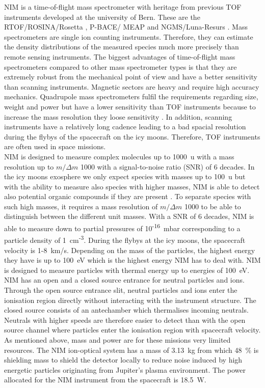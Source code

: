 	NIM is a time-of-flight mass spectrometer with heritage from previous TOF instruments developed at the university of Bern. These are the RTOF/ROSINA/Rosetta \cite{Balsiger2007a,Scherer2006}, P-BACE/ MEAP \cite{Abplanalp2009a} and NGMS/Luna-Resurs \cite{Wurz2012264,Fausch_IEEE}. Mass spectrometers are single ion counting instruments. Therefore, they can estimate the density distributions of the measured species much more precisely than remote sensing instruments. The biggest advantages of time-of-flight mass spectrometers compared to other mass spectrometer types is that they are extremely robust from the mechanical point of view and have a better sensitivity than scanning instruments. Magnetic sectors are heavy and require high accuracy mechanics. Quadrupole mass spectrometers fulfil the requirements regarding size, weight and power but have a lower sensitivity than TOF instruments because to increase the mass resolution they loose sensitivity \cite{Quadrupol_WorkPrinc}. In addition, scanning instruments have a relatively long cadence \cite{MassSpec_Overview} leading to a bad spacial resolution during the flybys of the spacecraft on the icy moons. Therefore, TOF instruments are often used in space missions.\\
	NIM is designed to measure complex molecules up to 1000~u with a mass resolution up to $m/\Delta m$ 1000 with a signal-to-noise ratio (SNR) of 6 decades. In the icy moons exosphere we only expect species with masses up to 100~u but with the ability to measure also species with higher masses, NIM is able to detect also potential organic compounds if they are present \cite{NIM_Req_dMSNR}. To separate species with such high masses, it requires a mass resolution of $m/\Delta m$ 1000 to be able to distinguish between the different unit masses. With a SNR of 6 decades, NIM is able to measure down to partial pressures of 10\textsuperscript{-16}~mbar corresponding to a particle density of 1~cm\textsuperscript{-3}. During the flybys at the icy moons, the spacecraft velocity is 1-8~km/s. Depending on the mass of the particles, the highest energy they have is up to 100~eV which is the highest energy NIM has to deal with. NIM is designed to measure particles with thermal energy up to energies of 100~eV. NIM has an open and a closed source entrance for neutral particles and ions. Through the open source entrance slit, neutral particles and ions enter the ionisation region directly without interacting with the instrument structure. The closed source consists of an antechamber which thermalises incoming neutrals. Neutrals with higher speeds are therefore easier to detect than with the open source channel where particles enter the ionisation region with spacecraft velocity. As mentioned above, mass and power are for these missions very limited resources. The NIM ion-optical system has a mass of 3.13~kg from which 48~\% is shielding mass to shield the detector locally to reduce noise induced by high energetic particles originating from Jupiter's plasma environment. The power allocated for the NIM instrument from the spacecraft is 18.5~W.

